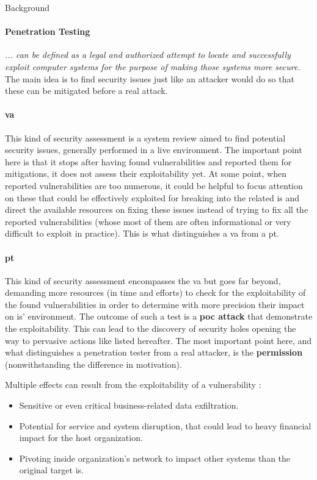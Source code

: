 \begin{chaptercover}{Background}
\paragraph{Penetration Testing} \textit{... can be defined as a legal and authorized attempt to locate and successfully exploit computer systems for the purpose of making those systems more secure.} \cite{basics-of-hacking-and-pt} The main idea is to find security issues just like an attacker would do so that these can be mitigated before a real attack.

\paragraph{\acrfull{va}} This kind of security assessment is a system review aimed to find potential security issues, generally performed in a live environment. The important point here is that it stops after having found vulnerabilities and reported them for mitigations, it does not assess their exploitability yet. At some point, when reported vulnerabilities are too numerous, it could be helpful to focus attention on these that could be effectively exploited for breaking into the related \acrshort{is} and direct the available resources on fixing these issues instead of trying to fix all the reported vulnerabilities (whose most of them are often informational or very difficult to exploit in practice). This is what distinguishes a \acrlong{va} from a \acrlong{pt}.

\paragraph{\acrfull{pt}} This kind of security assessment encompasses the \acrshort{va} but goes far beyond, demanding more resources (in time and efforts) to check for the exploitability of the found vulnerabilities in order to determine with more precision their impact on \acrshort{is}' environment. The outcome of such a test is a \textbf{\acrfull{poc} attack} that demonstrate the exploitability. This can lead to the discovery of security holes opening the way to pervasive actions like listed hereafter. The most important point here, and what distinguishes a penetration tester from a real attacker, is the \textbf{permission} (nonwithstanding the difference in motivation).

Multiple effects can result from the exploitability of a vulnerability :
\begin{itemize}[itemsep=0.1cm,topsep=0.1cm]
  \item Sensitive or even critical business-related data exfiltration.
  \item Potential for service and system disruption, that could lead to heavy financial impact for the host organization.
  \item Pivoting inside organization's network to impact other systems than the original target \acrshort{is}.
\end{itemize}


\end{chaptercover}
